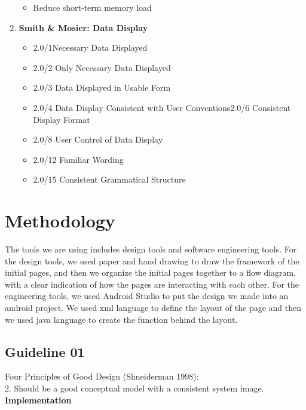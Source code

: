 \documentclass{article}
\begin{document}
\begin{enumerate}
\begin{itemize}
\item Reduce short-term memory load
\end{itemize}
\item{\bf Smith \& Mosier: Data Display}
\begin{itemize}
\item 2.0/1Necessary Data Displayed
\item 2.0/2 Only Necessary Data Displayed
\item 2.0/3 Data Displayed in Usable Form
\item 2.0/4 Data Display Consistent with User Conventions2.0/6 Consistent Display Format
\item 2.0/8 User Control of Data Display
\item 2.0/12 Familiar Wording
\item 2.0/15 Consistent Grammatical Structure
\end{itemize}
\end{enumerate}

\section{Methodology}
The tools we are using includes design tools and software engineering tools.
For the design tools, we used paper and hand drawing to draw the framework of the initial pages, and then we organize
the initial pages together to a flow diagram, with a clear indication of how the pages are interacting with each other.
For the engineering tools, we used Android Studio to put the design we made into an android project. We used xml
language to define the layout of the page and then we used java language to create the function behind the layout.

\subsection{Guideline 01}
Four Principles of Good Design (Shneiderman 1998):\\
2. Should be a good conceptual model with a consistent system image.\\

\noindent
{\bf Implementation}
\end{document}
